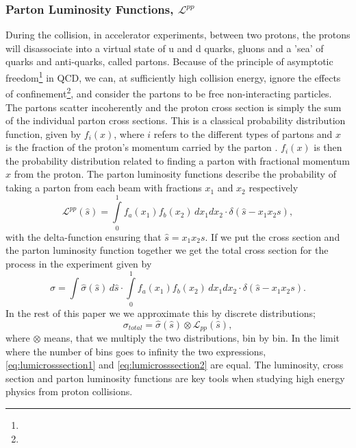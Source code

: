 \subsubsection{Parton Luminosity Functions, $\mathcal{L}^{pp}$}
During the collision, in accelerator experiments, between two protons, the protons will disassociate into a virtual state of u and d quarks, gluons and a 'sea' of quarks and anti-quarks, called partons. Because of the principle of asymptotic freedom\footnote{} in QCD, we can, at sufficiently high collision energy, ignore the effects of confinement\footnote{}, and consider the partons to be free non-interacting particles. The partons scatter incoherently and the proton cross section is simply the sum of the individual parton cross sections. This is a classical probability distribution function, given by $f_{i}(x)$, where $i$ refers to the different types of partons and $x$ is the fraction of the proton's momentum carried by the parton \cite{green2005hpp}. $f_{i}(x)$ is then the probability distribution related to finding a parton with fractional momentum $x$ from the proton. The parton luminosity functions describe the probability of taking a parton from each beam with fractions $x_{1}$ and $x_{2}$ respectively
\begin{equation}
\mathcal{L}^{pp}(\hat s)=\int\limits_{0}^{1} f_{a}(x_{1}) f_{b}(x_{2})\, dx_{1}dx_{2}\cdot \delta(\hat s - x_{1}x_{2}s),
\end{equation}
with the delta-function ensuring that $\hat s = x_{1}x_{2}s$. If we put the cross section and the parton luminosity function together we get the total cross section for the process in the experiment given by
\begin{equation} \label{eq:lumicrosssection1}
\sigma=\int \hat \sigma(\hat s) \, d \hat s \cdot \int\limits_{0}^{1} f_{a}(x_{1}) f_{b}(x_{2})\, dx_{1}dx_{2} \cdot \delta(\hat s - x_{1}x_{2}s).
\end{equation}
In the rest of this paper we we approximate this by discrete distributions;
\begin{equation} \label{eq:lumicrosssection2}
\sigma_{total}= \hat \sigma(\hat s) \otimes  \mathcal{L}_{pp}(\hat s),
\end{equation}
where $\otimes$ means, that we multiply the two distributions, bin by bin. In the limit where the number of bins goes to infinity the two expressions, \eqref{eq:lumicrosssection1} and \eqref{eq:lumicrosssection2} are equal. The luminosity, cross section and parton luminosity functions are key tools when studying high energy physics from proton collisions. %